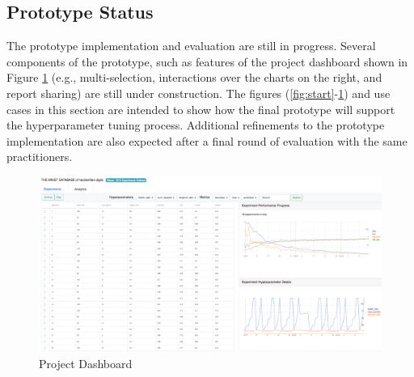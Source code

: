 \documentclass[preprint]{vgtc}        %
\begin{document}
\subsection{Prototype Status} The prototype implementation and evaluation are still in progress. Several components of the prototype, such as features of the project dashboard shown in Figure \ref{fig:allrun} (e.g., multi-selection, interactions over the charts on the right, and report sharing) are still under construction. The figures (\ref{fig:start}-\ref{fig:allrun}) and use cases in this section are intended to show how the final prototype will support the hyperparameter tuning process. Additional refinements to the prototype implementation are also expected after a final round of evaluation with the same practitioners.
\begin{figure}
 \includegraphics[width=\columnwidth]{pictures/allrun}
 \caption{Project Dashboard}
 \label{fig:allrun}
\end{figure}
\end{document}
